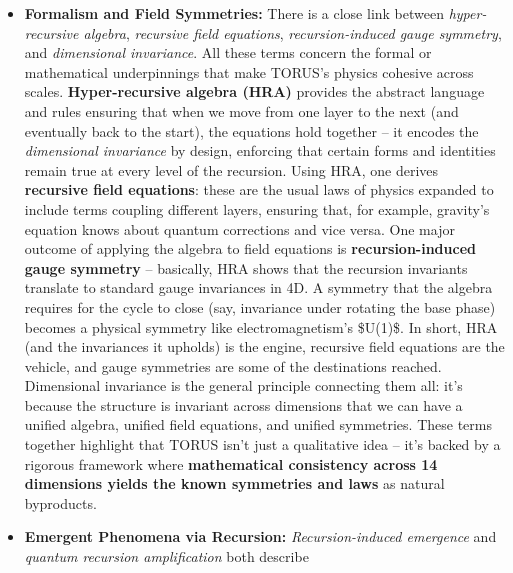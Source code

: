 \documentclass[]{article}
\begin{document}
{\begin{itemize}
  of observer and observed -- but while observer-state is a broad,
  structural concept (used in things like defining OSQNs or building
  recursive AGIs), observer coherence is a specific physical
  \emph{manifestation} to test (like the two-slit thought experiment's
  tiny fringe changes). Together, they illustrate TORUS's move to
  \textbf{erase the boundary between observer and system}, bringing
  measurement into the fold of fundamental theory.
\item
  \textbf{Formalism and Field Symmetries:} There is a close link between
  \emph{hyper-recursive algebra}, \emph{recursive field equations},
  \emph{recursion-induced gauge symmetry}, and \emph{dimensional
  invariance}. All these terms concern the formal or mathematical
  underpinnings that make TORUS's physics cohesive across scales.
  \textbf{Hyper-recursive algebra (HRA)} provides the abstract language
  and rules ensuring that when we move from one layer to the next (and
  eventually back to the start), the equations hold together -- it
  encodes the \emph{dimensional invariance} by design, enforcing that
  certain forms and identities remain true at every level of the
  recursion​. Using HRA, one derives \textbf{recursive field equations}:
  these are the usual laws of physics expanded to include terms coupling
  different layers, ensuring that, for example, gravity's equation knows
  about quantum corrections and vice versa​. One major outcome of
  applying the algebra to field equations is \textbf{recursion-induced
  gauge symmetry} -- basically, HRA shows that the recursion invariants
  translate to standard gauge invariances in 4D​. A symmetry that the
  algebra requires for the cycle to close (say, invariance under
  rotating the base phase) becomes a physical symmetry like
  electromagnetism's \$U(1)\$. In short, HRA (and the invariances it
  upholds) is the engine, recursive field equations are the vehicle, and
  gauge symmetries are some of the destinations reached. Dimensional
  invariance is the general principle connecting them all: it's because
  the structure is invariant across dimensions that we can have a
  unified algebra, unified field equations, and unified symmetries.
  These terms together highlight that TORUS isn't just a qualitative
  idea -- it's backed by a rigorous framework where \textbf{mathematical
  consistency across 14 dimensions yields the known symmetries and laws}
  as natural byproducts.
\item
  \textbf{Emergent Phenomena via Recursion:} \emph{Recursion-induced
  emergence} and \emph{quantum recursion amplification} both describe

\end{itemize}}
\end{document}
